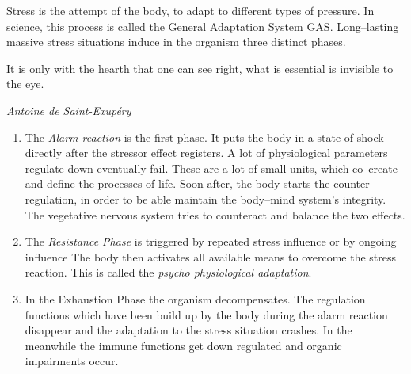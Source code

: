 \documentclass[../Book.Stress_regulation.tex]{subfiles}
\begin{document}
Stress is the attempt of the body, to {adapt} to different types of pressure. 
 In science, this process is called the {General Adaptation System} GAS.
 {Long--lasting massive stress} situations induce in the organism three distinct phases.

 \epigraph{It is only with the hearth that one can see right, what is essential is invisible to the eye.}{\textit{Antoine de Saint-Exup\'ery}}
 
 \begin{enumerate}
 \item The \emph{Alarm reaction} is the first phase.
   It puts the body in a state of shock directly after the stressor effect registers.
   A lot of {physiological parameters regulate down eventually fail}. These are a lot of small units, which co--create and define the processes of life.
Soon after, the body starts the {counter--regulation}, in order to be able maintain the body--mind system's integrity. The vegetative nervous system tries to counteract and balance the two effects.
\item The \emph{Resistance Phase} is triggered by {repeated stress} influence or by {ongoing} influence
The body then activates all available means to overcome the stress reaction. This is called the \emph{psycho physiological adaptation}.
\item In the Exhaustion Phase the organism {decompensates}.
The {regulation functions} which have been build up by the body during the alarm reaction disappear and the {adaptation} to the stress situation {crashes}.
In the meanwhile the {immune functions} get down regulated and {organic impairments} occur.
 \end{enumerate}
\end{document}

